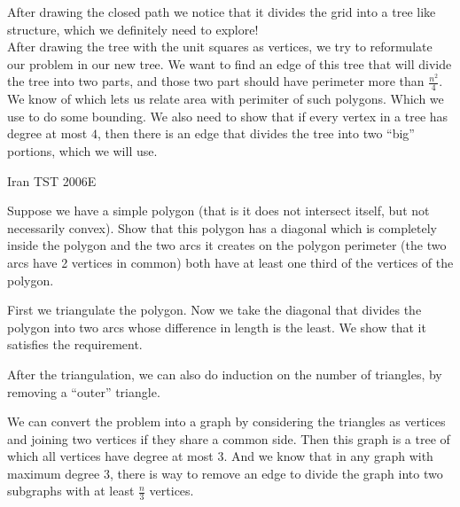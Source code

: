 \begin{solution}[grobber]
    After drawing the closed path we notice that it divides the grid into a
    tree like structure, which we definitely need to explore!\\

    After drawing the tree with the unit squares as vertices, we try to
    reformulate our problem in our new tree. We want to find an edge of
    this tree that will divide the tree into two parts, and those two part
    should have perimeter more than $\frac{n^2}{4}$. \\

    We know of  which lets us
    relate area with perimiter of such polygons. Which we use to do some
    bounding. We also need to show that if every vertex in a tree has degree 
    at most $4$, then there is an edge that divides the tree into two ``big''
    portions, which we will use.
\end{solution}

{Iran TST 2006}{E}{
    Suppose we have a simple polygon (that is it does not intersect itself,
    but not necessarily convex). Show that this polygon has a diagonal which
    is completely inside the polygon and the two arcs it creates on the
    polygon perimeter (the two arcs have 2 vertices in common) both have at
    least one third of the vertices of the polygon.

}

\begin{solution}[grobber]
    First we triangulate the polygon. Now we take the diagonal that divides
    the polygon into two arcs whose difference in length is the least. We show
    that it satisfies the requirement.
\end{solution}

\begin{solution}[induction]
    After the triangulation, we can also do induction on the number of
    triangles, by removing a ``outer'' triangle.
\end{solution}

\begin{solution}
    We can convert the problem into a graph by considering the triangles as
    vertices and joining two vertices if they share a common side. Then this
    graph is a tree of which all vertices have degree at most $3$. And we know
    that in any graph with maximum degree $3$, there is way to remove an edge
    to divide the graph into two subgraphs with at least $\frac{n}{3}$
    vertices.
\end{solution}



